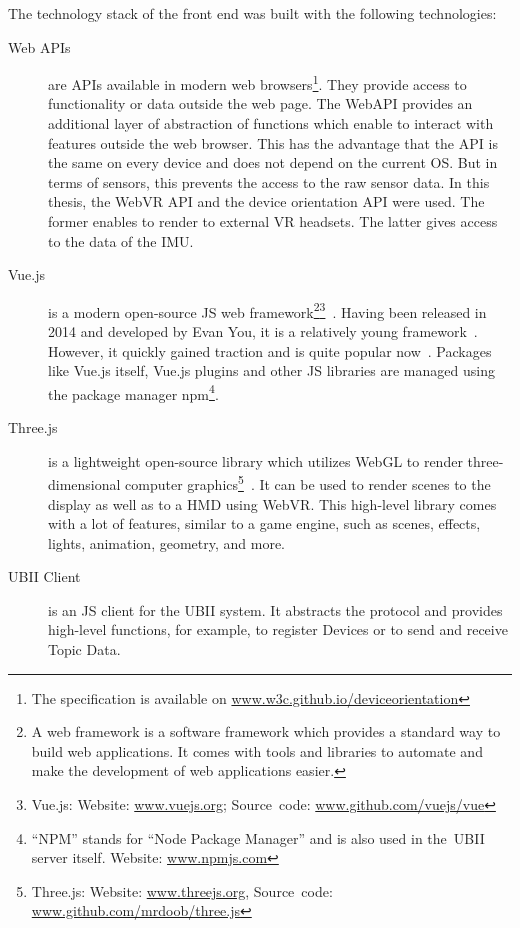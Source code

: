 The technology stack of the front end was built with the following technologies:
\begin{description}
	\item[Web APIs] are \glspl{API} available in modern web browsers\footnote{The specification is available on \href{https://w3c.github.io/deviceorientation/}{www.w3c.github.io/deviceorientation}}. They provide access to functionality or data outside the web page. The WebAPI provides an additional layer of abstraction of functions which enable to interact with features outside the web browser. This has the advantage that the API is the same on every device and does not depend on the current \gls{OS}. But in terms of sensors, this prevents the access to the raw sensor data. In this thesis, the WebVR \gls{API} and the device orientation \gls{API} were used. The former enables to render to external \gls{VR} headsets. The latter gives access to the data of the \gls{IMU}.
	 
	\item[Vue.js] is a modern open-source \gls{JS} web framework\footnote{A web framework is a software framework which provides a standard way to build web applications. It comes with tools and libraries to automate and make the development of web applications easier.}\footnote{Vue.js: Website: \href{https://vuejs.org/}{www.vuejs.org}; Source~code: \href{https://github.com/vuejs/vue}{www.github.com/vuejs/vue}}~\cite{You.2019}. Having been released in 2014 and developed by Evan You, it is a relatively young framework~\cite[17]{Koetsier.2016}. However, it quickly gained traction and is quite popular now~\cite[12\psq]{Koetsier.2016}.
  Packages like Vue.js itself, Vue.js plugins and other \gls{JS} libraries are managed using the package manager npm\footnote{\enquote{NPM} stands for \enquote{Node Package Manager} and is also used in the~\gls{UBII} server itself. Website: \href{https://www.npmjs.com/}{www.npmjs.com}}.
  
	\item[Three.js] is a lightweight open-source library which utilizes WebGL to render three-dimensional computer graphics\footnote{Three.js: Website: \href{https://threejs.org/}{www.threejs.org}, Source~code: \href{https://github.com/mrdoob/three.js/}{www.github.com/mrdoob/three.js}}~\cite{Cabello.2019}. It can be used to render scenes to the display as well as to a \gls{HMD} using WebVR. This high-level library comes with a lot of features, similar to a game engine, such as scenes, effects, lights, animation, geometry, and more.
	 
	\item[UBII Client] is an \acrlong{JS} client for the \gls{UBII} system. It abstracts the protocol and provides high-level functions, for example, to register Devices or to send and receive Topic Data.
\end{description}

